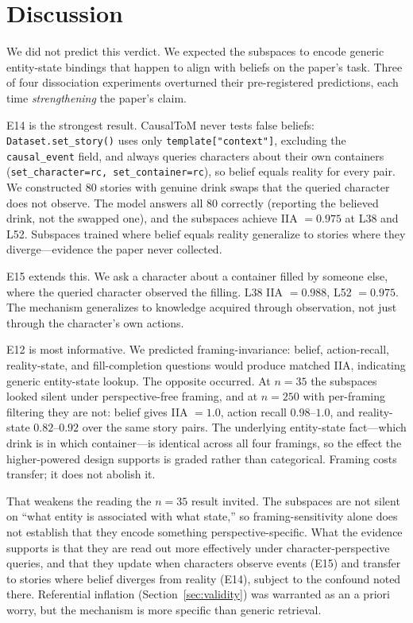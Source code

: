 \documentclass{article}
\begin{document}
\section{Discussion}
\label{sec:discussion}

We did not predict this verdict. We expected the subspaces to encode generic entity-state bindings that happen to align with beliefs on the paper's task. Three of four dissociation experiments overturned their pre-registered predictions, each time \emph{strengthening} the paper's claim.

E14 is the strongest result. CausalToM never tests false beliefs: \texttt{Dataset.set\_story()} uses only \texttt{template["context"]}, excluding the \texttt{causal\_event} field, and always queries characters about their own containers (\texttt{set\_character=rc, set\_container=rc}), so belief equals reality for every pair. We constructed 80 stories with genuine drink swaps that the queried character does not observe. The model answers all 80 correctly (reporting the believed drink, not the swapped one), and the subspaces achieve IIA $= 0.975$ at L38 and L52. Subspaces trained where belief equals reality generalize to stories where they diverge---evidence the paper never collected.

E15 extends this. We ask a character about a container filled by someone else, where the queried character observed the filling. L38 IIA $= 0.988$, L52 $= 0.975$. The mechanism generalizes to knowledge acquired through observation, not just through the character's own actions.

E12 is most informative. We predicted framing-invariance: belief, action-recall, reality-state, and fill-completion questions would produce matched IIA, indicating generic entity-state lookup. The opposite occurred. At $n = 35$ the subspaces looked silent under perspective-free framing, and at $n = 250$ with
per-framing filtering they are not: belief gives IIA $= 1.0$, action recall $0.98$--$1.0$, and
reality-state $0.82$--$0.92$ over the same story pairs. The underlying entity-state
fact---which drink is in which container---is identical across all four framings, so the
effect the higher-powered design supports is graded rather than categorical. Framing costs
transfer; it does not abolish it.

That weakens the reading the $n = 35$ result invited. The subspaces are not silent on
``what entity is associated with what state,'' so framing-sensitivity alone does not
establish that they encode something perspective-specific. What the evidence supports is
that they are read out more effectively under character-perspective queries, and that they
update when characters observe events (E15) and transfer to stories where belief diverges
from reality (E14), subject to the confound noted there. Referential inflation (Section~\ref{sec:validity}) was warranted as an a priori worry, but the mechanism is more specific than generic retrieval.
\end{document}
